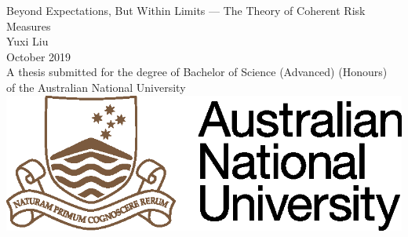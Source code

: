 \begin{titlepage}
\begin{center}

\vspace*{\fill} \Huge
                        Beyond Expectations, But Within Limits --- The Theory of Coherent Risk Measures
\\
\vfill\vfill\Large
                          Yuxi Liu
\\
\vfill\vfill
                          October 2019
\\
\vfill\vfill \normalsize
         A thesis submitted for the degree of Bachelor of Science (Advanced) (Honours)\\
         of the Australian National University
\vfill
         \includegraphics{ANU.eps}

\end{center}

\end{titlepage}
